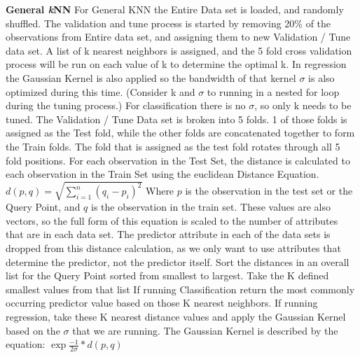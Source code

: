 \documentclass[twoside,11pt]{article}
\begin{document}
\noindent \textbf{General \textit{k}NN}\newline
For General KNN the Entire Data set is loaded, and randomly shuffled.\newline
The validation and tune process is started by removing 20\% of the observations from Entire data set, and assigning them to new Validation / Tune  data set.\newline
A list of k nearest neighbors is assigned, and the 5 fold cross validation process will be run on each value of k to determine the optimal k. In regression the Gaussian Kernel is also applied so the bandwidth of that kernel $\sigma$ is also optimized during this time. (Consider k and $\sigma$ to running in a nested for loop during the tuning process.) For classification there is no $\sigma$, so only k needs to be tuned.\newline 
The Validation / Tune Data set is broken into 5 folds. 1 of those folds is assigned as the Test fold, while the other folds are concatenated together to form the Train folds. The fold that is assigned as the test fold rotates through all 5 fold positions.\newline
For each observation in the Test Set, the distance is calculated to each observation in the Train Set using the euclidean Distance Equation. 
 $d\left( p,q\right)   = \sqrt {\sum _{i=1}^{n}  \left( q_{i}-p_{i}\right)^2 } $\newline
Where $p$ is the observation in the test set or the Query Point, and $q$ is the observation in the train set. These values are also vectors, so the full form of this equation is scaled to the number of attributes that are in each data set. 
The predictor attribute in each of the data sets is dropped from this distance calculation, as we only want to use attributes that determine the predictor, not the predictor itself.\newline
Sort the distances in an overall list for the Query Point sorted from smallest to largest.\newline
Take the K defined smallest values from that list\newline 
If running Classification return the most commonly occurring predictor value based on those K nearest neighbors.\newline 
If running regression, take these K nearest distance values and apply the Gaussian Kernel based on the $\sigma$ that we are running. The Gaussian Kernel is described by the equation: 
$\exp {\frac{-1}{2\sigma} * d\left( p,q\right)}$\newline
\end{document}
